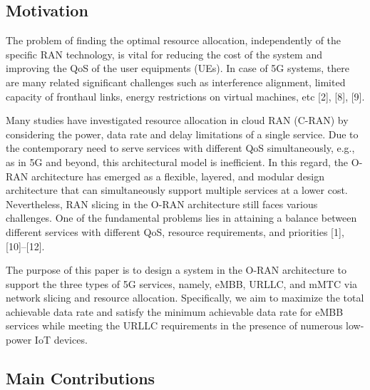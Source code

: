 \documentclass[12pt, letterpaper]{article}
\begin{document}
\subsection{Motivation}
The problem of finding the optimal resource allocation, independently of the specific RAN technology, is vital for reducing the cost of the system and improving the QoS of the user equipments (UEs). In case of 5G systems, there are many related significant challenges such as interference alignment, limited capacity of fronthaul links, energy restrictions on virtual machines, etc [2], [8], [9]. 

Many studies have investigated resource allocation in cloud RAN (C-RAN) by considering the power, data rate and delay limitations of a single service. Due to the contemporary need to serve services with different QoS simultaneously, e.g., as in 5G and beyond, this architectural model is inefficient. In this regard, the O-RAN architecture has emerged as a flexible, layered, and modular design architecture that can simultaneously support multiple services at a lower cost. Nevertheless, RAN slicing in the O-RAN architecture still faces various challenges. 
One of the fundamental problems lies in attaining a balance between different services with different QoS, resource requirements, and priorities [1], [10]–[12].  

The purpose of this paper is to design a system in the O-RAN architecture to support the three types of 5G services, namely, eMBB, URLLC, and mMTC via network slicing and resource allocation. Specifically, we aim to maximize the total achievable data rate and satisfy the minimum achievable data rate for eMBB services while meeting the URLLC requirements in the presence of numerous low-power IoT devices.

\subsection{Main Contributions}
\end{document}
